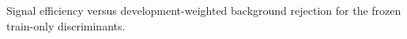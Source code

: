 Signal efficiency versus development-weighted background rejection for the frozen train-only discriminants.
